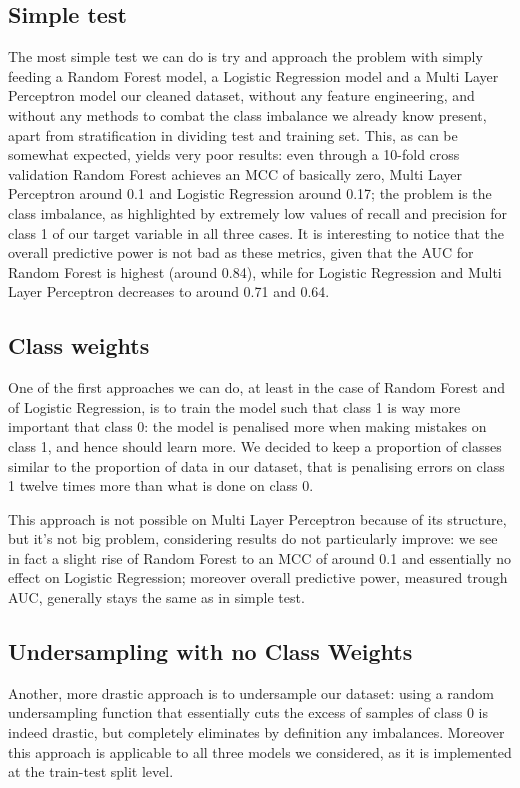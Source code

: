 \documentclass[a4paper,11pt]{article}
\begin{document}
\subsection{Simple test}
The most simple test we can do is try and approach the problem with simply feeding a Random Forest model, a Logistic Regression model and a Multi Layer Perceptron model our cleaned dataset, without any feature engineering, and without any methods to combat the class imbalance we already know present, apart from stratification in dividing test and training set. 
This, as can be somewhat expected, yields very poor results: even through a 10-fold cross validation Random Forest achieves an MCC of basically zero, Multi Layer Perceptron around 0.1 and Logistic Regression around 0.17; the problem is the class imbalance, as highlighted by extremely low values of recall and precision for class 1 of our target variable in all three cases. It is interesting to notice that the overall predictive power is not bad as these metrics, given that the AUC for Random Forest is highest (around 0.84), while for Logistic Regression and Multi Layer Perceptron decreases to around 0.71 and 0.64. 
\subsection{Class weights}
One of the first approaches we can do, at least in the case of Random Forest and of Logistic Regression, is to train the model such that class 1 is way more important that class 0: the model is penalised more when making mistakes on class 1, and hence should learn more. We decided to keep a proportion of classes similar to the proportion of data in our dataset, that is penalising errors on class 1 twelve times more than what is done on class 0. 

This approach is not possible on Multi Layer Perceptron because of its structure, but it's not big problem, considering results do not particularly improve: we see in fact a slight rise of Random Forest to an MCC of around 0.1 and essentially no effect on Logistic Regression; moreover overall predictive power, measured trough AUC, generally stays the same as in simple test.
\subsection{Undersampling with no Class Weights}
Another, more drastic approach is to undersample our dataset: using a random undersampling function that essentially cuts the excess of samples of class 0 is indeed drastic, but completely eliminates by definition any imbalances. Moreover this approach is applicable to all three models we considered, as it is implemented at the train-test split level.
\end{document}
